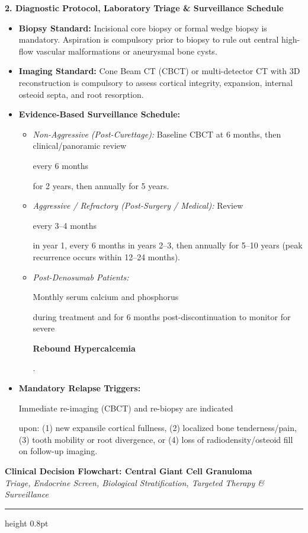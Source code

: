 \documentclass[9pt,a4paper]{article}
\newcommand{\hlg}[1]{\colorbox{hlgray}{\strut #1}}
\newcommand{\hly}[1]{\colorbox{hlyellow}{\strut #1}}
\newcommand{\hlr}[1]{\colorbox{hlred}{\strut\color{darkred}#1}}
\begin{document}
\vspace{2pt}
{\large\bfseries 2. Diagnostic Protocol, Laboratory Triage \& Surveillance Schedule}
\vspace{1pt}

\begin{itemize}
    \item \textbf{Biopsy Standard:} Incisional core biopsy or formal wedge biopsy is mandatory. Aspiration is compulsory prior to biopsy to rule out central high-flow vascular malformations or aneurysmal bone cysts.
    \item \textbf{Imaging Standard:} Cone Beam CT (CBCT) or multi-detector CT with 3D reconstruction is compulsory to assess cortical integrity, expansion, internal osteoid septa, and root resorption.
    \item \textbf{Evidence-Based Surveillance Schedule:}
    \begin{itemize}
        \item \textit{Non-Aggressive (Post-Curettage):} Baseline CBCT at 6 months, then clinical/panoramic review \hlg{every 6 months} for 2 years, then annually for 5 years.
        \item \textit{Aggressive / Refractory (Post-Surgery / Medical):} Review \hlg{every 3--4 months} in year 1, every 6 months in years 2--3, then annually for 5--10 years (peak recurrence occurs within 12--24 months).
        \item \textit{Post-Denosumab Patients:} \hlr{Monthly serum calcium and phosphorus} during treatment and for 6 months post-discontinuation to monitor for severe \hlr{\textbf{Rebound Hypercalcemia}}.
    \end{itemize}
    \item \textbf{Mandatory Relapse Triggers:} \hly{Immediate re-imaging (CBCT) and re-biopsy are indicated} upon: (1) new expansile cortical fullness, (2) localized bone tenderness/pain, (3) tooth mobility or root divergence, or (4) loss of radiodensity/osteoid fill on follow-up imaging.
\end{itemize}

\clearpage

\begin{center}
{\Large\bfseries Clinical Decision Flowchart: Central Giant Cell Granuloma}\\[2pt]
{\small\itshape Triage, Endocrine Screen, Biological Stratification, Targeted Therapy \& Surveillance}
\end{center}
\vspace{-4pt}
\hrule height 0.8pt
\vspace{10pt}
\end{document}
